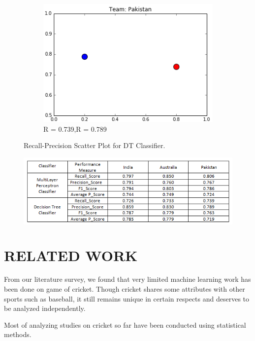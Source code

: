 \documentclass[a4paper, 10pt, conference]{IEEEtran}
\begin{document}
\begin{figure}[h!]
\begin{subfigure}[b]{0.4\linewidth}
    \includegraphics[width=\linewidth]{DTCLF_Pakistan.png}
    \caption{R = 0.739,R = 0.789}
  \end{subfigure}
  \caption{Recall-Precision Scatter Plot for DT Classifier.}
  \label{fig:dtclfPlots}
\end{figure}

\begin{figure}[h!]
  \includegraphics[width=\linewidth]{TeamScore.png}
  \label{fig:results}
\end{figure}


\section{RELATED WORK}
From our literature survey, we found that very limited machine learning work has been done on game of cricket.  Though cricket shares some attributes with other sports such as baseball, it still remains unique in certain respects and deserves to be analyzed independently.

Most of analyzing studies on cricket so far have been conducted using statistical methods.
\end{document}
